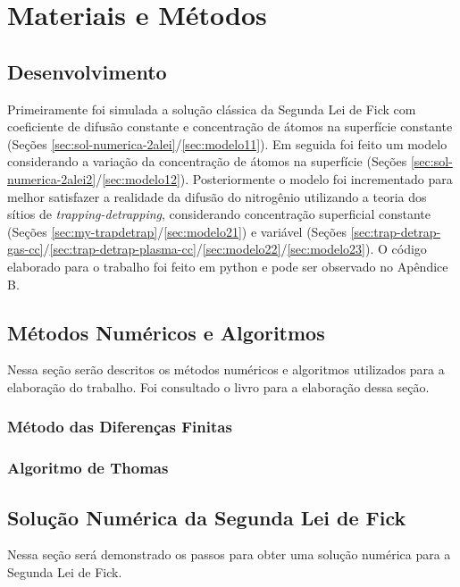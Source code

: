 \documentclass[]{politex}
\begin{document}
\chapter{Materiais e Métodos}
\section{Desenvolvimento}
Primeiramente foi simulada a solução clássica da Segunda Lei de Fick com coeficiente de difusão constante e concentração de átomos na superfície constante (Seções \ref{sec:sol-numerica-2alei}/\ref{sec:modelo11}). Em seguida foi feito um modelo considerando a variação da concentração de átomos na superfície (Seções \ref{sec:sol-numerica-2alei2}/\ref{sec:modelo12}). Posteriormente o modelo foi incrementado para melhor satisfazer a realidade da difusão do nitrogênio utilizando a teoria dos sítios de \textit{trapping-detrapping}, considerando concentração superficial constante (Seções \ref{sec:my-trapdetrap}/\ref{sec:modelo21}) e variável (Seções \ref{sec:trap-detrap-gas-cc}/\ref{sec:trap-detrap-plasma-cc}/\ref{sec:modelo22}/\ref{sec:modelo23}).
O código elaborado para o trabalho foi feito em python e pode ser observado no Apêndice B.

\section{Métodos Numéricos e Algoritmos}
Nessa seção serão descritos os métodos numéricos e algoritmos utilizados para a elaboração do trabalho. Foi consultado o livro \cite{fortuna2009tecnicas} para a elaboração dessa seção.

\subsection{Método das Diferenças Finitas}
\label{sec:dif-fin}


\subsection{Algoritmo de Thomas}	
\label{sec:algo-thomas}


\section{Solução Numérica da Segunda Lei de Fick}
Nessa seção será demonstrado os passos para obter uma solução numérica para a Segunda Lei de Fick. 
\end{document}
